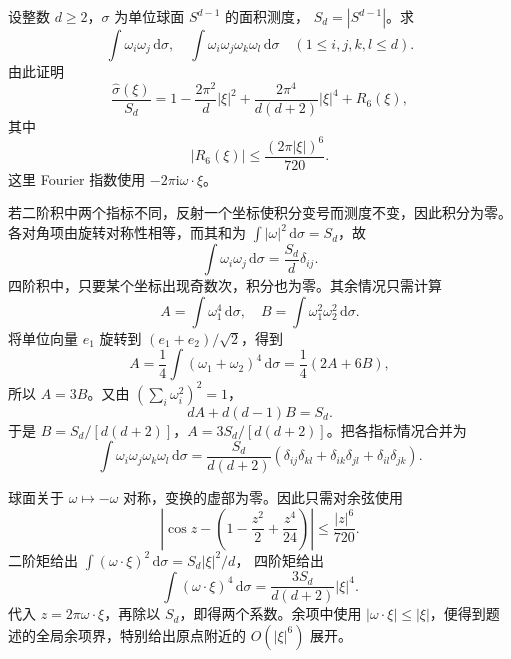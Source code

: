 \begin{exercise}\label{b2:ex:A2-sphere-moment}
设整数 \(d\geq2\)，\(\sigma\) 为单位球面 \(S^{d-1}\) 的面积测度，
\(S_d=|S^{d-1}|\)。求
\[
 \int\omega_i\omega_j\,\mathrm d\sigma,
 \quad
 \int\omega_i\omega_j\omega_k\omega_l\,\mathrm d\sigma
 \quad(1\leq i,j,k,l\leq d).
\]
由此证明
\[
 \frac{\widehat\sigma(\xi)}{S_d}
 =1-\frac{2\pi^2}{d}|\xi|^2
       +\frac{2\pi^4}{d(d+2)}|\xi|^4+R_6(\xi),
\]
其中
\[
 |R_6(\xi)|\leq\frac{(2\pi|\xi|)^6}{720}.
\]
这里 Fourier 指数使用 \(-2\pi\mathrm i\omega\cdot\xi\)。
\end{exercise}
\begin{solution}
若二阶积中两个指标不同，反射一个坐标使积分变号而测度不变，因此积分为零。各对角项由旋转对称性相等，而其和为
\(\int|\omega|^2\,\mathrm d\sigma=S_d\)，故
\[
 \int\omega_i\omega_j\,\mathrm d\sigma
       =\frac{S_d}{d}\delta_{ij}.
\]
四阶积中，只要某个坐标出现奇数次，积分也为零。其余情况只需计算
\[
 A=\int\omega_1^4\,\mathrm d\sigma,
 \quad B=\int\omega_1^2\omega_2^2\,\mathrm d\sigma.
\]
将单位向量 \(e_1\) 旋转到 \((e_1+e_2)/\sqrt2\)，得到
\[
 A=\frac14\int(\omega_1+\omega_2)^4\,\mathrm d\sigma
       =\frac14(2A+6B),
\]
所以 \(A=3B\)。又由 \((\sum_i\omega_i^2)^2=1\)，
\[
 dA+d(d-1)B=S_d.
\]
于是 \(B=S_d/[d(d+2)]\)，\(A=3S_d/[d(d+2)]\)。把各指标情况合并为
\[
 \int\omega_i\omega_j\omega_k\omega_l\,\mathrm d\sigma
 =\frac{S_d}{d(d+2)}
       (\delta_{ij}\delta_{kl}
        +\delta_{ik}\delta_{jl}
        +\delta_{il}\delta_{jk}).
\]

球面关于 \(\omega\mapsto-\omega\) 对称，变换的虚部为零。因此只需对余弦使用
\[
 \left|\cos z-\left(1-\frac{z^2}{2}+\frac{z^4}{24}\right)\right|
       \leq\frac{|z|^6}{720}.
\]
二阶矩给出
\(\int(\omega\cdot\xi)^2\,\mathrm d\sigma=S_d|\xi|^2/d\)，
四阶矩给出
\[
 \int(\omega\cdot\xi)^4\,\mathrm d\sigma
       =\frac{3S_d}{d(d+2)}|\xi|^4.
\]
代入 \(z=2\pi\omega\cdot\xi\)，再除以 \(S_d\)，即得两个系数。余项中使用
\(|\omega\cdot\xi|\leq|\xi|\)，便得到题述的全局余项界，特别给出原点附近的 \(O(|\xi|^6)\) 展开。
\end{solution}

